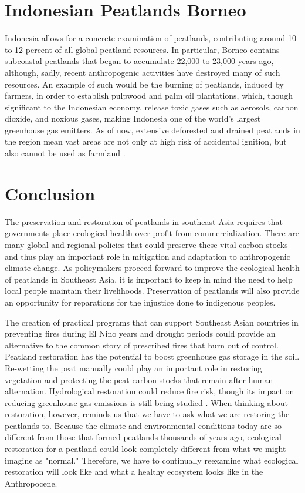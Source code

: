 \section{Indonesian Peatlands Borneo}

Indonesia allows for a concrete examination of peatlands, contributing around 10 to 12 percent of all global peatland resources. In particular, Borneo contains subcoastal peatlands that began to accumulate 22,000 to 23,000 years ago, although, sadly, recent anthropogenic activities have destroyed many of such resources. An example of such would be the burning of peatlands, induced by farmers, in order to establish pulpwood and palm oil plantations, which, though significant to the Indonesian economy, release toxic gases such as aerosols, carbon dioxide, and noxious gases, making Indonesia one of the world's largest greenhouse gas emitters. As of now, extensive deforested and drained peatlands in the region mean vast areas are not only at high risk of accidental ignition, but also cannot be used as farmland \citep{ballhorn2009derivation}.

\section{Conclusion}

The preservation and restoration of peatlands in southeast Asia requires that governments place ecological health over profit from commercialization. There are many global and regional policies that could preserve these vital carbon stocks and thus play an important role in mitigation and adaptation to anthropogenic climate change. As policymakers proceed forward to improve the ecological health of peatlands in Southeast Asia, it is important to keep in mind the need to help local people maintain their livelihoods. Preservation of peatlands will also provide an opportunity for reparations for the injustice done to indigenous peoples. 

The creation of practical programs that can support Southeast Asian countries in preventing fires during El Nino years and drought periods could provide an alternative to the common story of prescribed fires that burn out of control. Peatland restoration has the potential to boost greenhouse gas storage in the soil. Re-wetting the peat manually could play an important role in restoring vegetation and protecting the peat carbon stocks that remain after human alternation. Hydrological restoration could reduce fire risk, though its impact on reducing greenhouse gas emissions is still being studied \citep{page2009restoration}. When thinking about restoration, however, \citet{holden2005peatland} reminds us that we have to ask what we are restoring the peatlands to. Because the climate and environmental conditions today are so different from those that formed peatlands thousands of years ago, ecological restoration for a peatland could look completely different from what we might imagine as "normal." Therefore, we have to continually reexamine what ecological restoration will look like and what a healthy ecosystem looks like in the Anthropocene.

